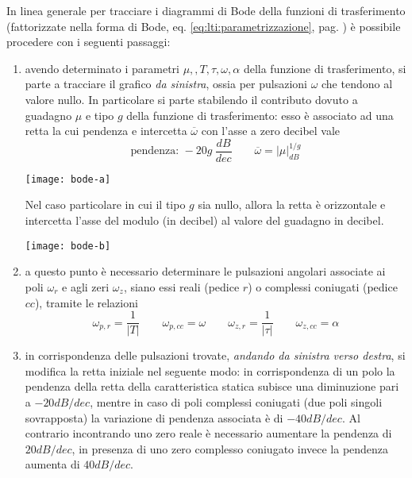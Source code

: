 		In linea generale per tracciare i diagrammi di Bode della funzioni di trasferimento (fattorizzate nella forma di Bode, eq. \ref{eq:lti:parametrizzazione}, pag. \pageref{eq:lti:parametrizzazione}) è possibile procedere con i seguenti passaggi:
		\begin{enumerate}
			\item avendo determinato i parametri $\mu,,T,\tau,\omega,\alpha$ della funzione di trasferimento, si parte a tracciare il grafico \textit{da sinistra}, ossia per pulsazioni $\omega$ che tendono al valore nullo. In particolare si parte stabilendo il contributo dovuto a guadagno $\mu$ e tipo $g$ della funzione di trasferimento: esso è associato ad una retta la cui pendenza e intercetta $\overline \omega$ con l'asse a zero decibel vale
			\[ \textrm{pendenza: } -20 g \ \frac{dB}{dec} \qquad \overline \omega = |\mu|^{1/g}_{dB} \]
			\begin{center}
				\texttt{[image: bode-a]}
			\end{center}
			Nel caso particolare in cui il tipo $g$ sia  nullo, allora la retta è orizzontale e intercetta l'asse del modulo (in decibel) al valore del guadagno in decibel.
			\begin{center}
				\texttt{[image: bode-b]}
			\end{center}
			
			\item a questo punto è necessario determinare le pulsazioni angolari associate ai poli $\omega_r$ e agli zeri $\omega_z$, siano essi reali (pedice $r$) o complessi coniugati (pedice $cc$), tramite le relazioni
			\[ \omega_{p,r} = \frac 1 {|T|} \qquad \omega_{p,cc} = \omega \qquad \omega_{z,r} = \frac 1 {|\tau|} \qquad \omega_{z,cc} = \alpha \]
			
			\item in corrispondenza delle pulsazioni trovate, \textit{andando da sinistra verso destra}, si modifica la retta iniziale nel seguente modo: in corrispondenza di un polo la pendenza della retta della caratteristica statica subisce una diminuzione pari a $-20dB/dec$, mentre in caso di poli complessi coniugati (due poli singoli sovrapposta) la variazione di pendenza associata è di $-40dB/dec$. Al contrario incontrando uno zero reale è necessario aumentare la pendenza di $20dB/dec$, in presenza di uno zero complesso coniugato invece la pendenza aumenta di $40dB/dec$.
			
		\end{enumerate}
			
			
			
			
			
			
			
			
	
		
		
	